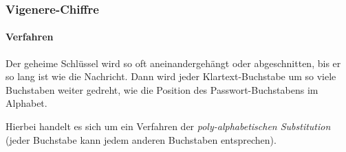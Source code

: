 			\subsubsection{Vigenere-Chiffre}
				\paragraph{Verfahren}
					Der geheime Schlüssel wird so oft aneinandergehängt oder abgeschnitten, bis er so lang ist wie die Nachricht. Dann wird jeder Klartext-Buchstabe um so viele Buchstaben weiter gedreht, wie die Position des Passwort-Buchstabens im Alphabet.


					Hierbei handelt es sich um ein Verfahren der \textit{poly-alphabetischen Substitution} (jeder Buchstabe kann jedem anderen Buchstaben entsprechen).

